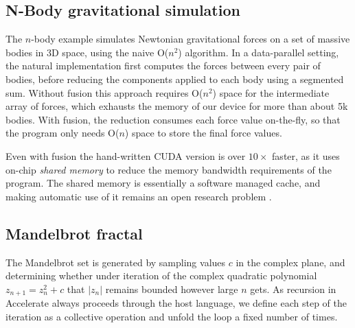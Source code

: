 \subsection{N-Body gravitational simulation}
The $n$-body example simulates Newtonian gravitational forces on a set of massive bodies in 3D space, using the naive O($n^2$) algorithm. In a data-parallel setting, the natural implementation first computes the forces between every pair of bodies, before reducing the components applied to each body using a segmented sum. Without fusion this approach requires O($n^2$) space for the intermediate array of forces, which exhausts the memory of our device for more than about 5k bodies. With fusion, the reduction consumes each force value on-the-fly, so that the program only needs O($n$) space to store the final force values.

Even with fusion the hand-written CUDA version is over $10\times$ faster, as it uses on-chip \emph{shared memory} to reduce the memory bandwidth requirements of the program. The shared memory is essentially a software managed cache, and making automatic use of it remains an open research problem \cite{Ma:ifp-shared-memory}. 



\subsection{Mandelbrot fractal}
The Mandelbrot set is generated by sampling values $c$ in the complex plane, and determining whether
under iteration of the complex quadratic polynomial $z_{n+1} = z_{n}^{2} + c$ that $\left| z_{n} \right|$ remains bounded however large $n$ gets. As recursion in Accelerate always proceeds through the host language, we define each step of the iteration as a collective operation and unfold the loop a fixed number of times. 

